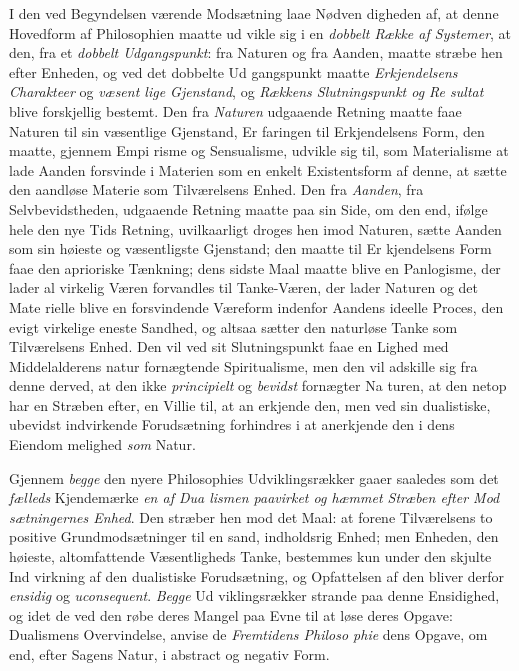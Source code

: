 I den ved Begyndelsen værende Modsætning laae Nødven\-%
digheden af, at denne Hovedform af Philosophien maatte ud\-%
vikle sig i en \emph{dobbelt Række af Systemer}, at den, fra et
\emph{dobbelt Udgangspunkt}: fra Naturen og fra Aanden,
maatte stræbe hen efter Enheden, og ved det dobbelte Ud\-%
gangspunkt maatte \emph{Erkjendelsens Charakteer} og \emph{væsent\-%
lige Gjenstand}, og \emph{Rækkens Slutningspunkt og Re\-%
sultat} blive forskjellig bestemt. Den fra \emph{Naturen} udgaaende
Retning maatte faae Naturen til sin væsentlige Gjenstand, Er\-%
faringen til Erkjendelsens Form, den maatte, gjennem Empi\-%
risme og Sensualisme, udvikle sig til, som Materialisme at lade
Aanden forsvinde i Materien som en enkelt Existentsform af
denne, at sætte den aandløse Materie som Tilværelsens Enhed.
Den fra \emph{Aanden}, fra Selvbevidstheden, udgaaende Retning
maatte paa sin Side, om den end, ifølge hele den nye Tids
Retning, uvilkaarligt droges hen imod Naturen, sætte Aanden
som sin høieste og væsentligste Gjenstand; den maatte til Er\-%
kjendelsens Form faae den aprioriske Tænkning; dens sidste
Maal maatte blive en Panlogisme, der lader al virkelig Væren
 forvandles til Tanke-Væren, der lader Naturen og det Mate\-%
rielle blive en forsvindende Væreform indenfor Aandens ideelle
Proces, den evigt virkelige eneste Sandhed, og altsaa sætter
den naturløse Tanke som Tilværelsens Enhed. Den vil ved
sit Slutningspunkt faae en Lighed med Middelalderens natur\-%
fornægtende Spiritualisme, men den vil adskille sig fra denne
derved, at den ikke \emph{principielt} og \emph{bevidst} fornægter Na\-%
turen, at den netop har en Stræben efter, en Villie til, at an\-%
erkjende den, men ved sin dualistiske, ubevidst indvirkende
Forudsætning forhindres i at anerkjende den i dens Eiendom\-%
melighed \emph{som} Natur.

Gjennem \emph{begge} den nyere Philosophies Udviklingsrækker
gaaer saaledes som det \emph{fælleds} Kjendemærke \emph{en af Dua\-%
lismen paavirket og hæmmet Stræben efter Mod\-%
sætningernes Enhed}. Den stræber hen mod det Maal: at
forene Tilværelsens to positive Grundmodsætninger til en sand,
indholdsrig Enhed; men Enheden, den høieste, altomfattende
Væsentligheds Tanke, bestemmes kun under den skjulte Ind\-%
virkning af den dualistiske Forudsætning, og Opfattelsen af
den bliver derfor \emph{ensidig} og \emph{uconsequent}. \emph{Begge} Ud\-%
viklingsrækker strande paa denne Ensidighed, og idet de ved
den røbe deres Mangel paa Evne til at løse deres Opgave:
Dualismens Overvindelse, anvise de \emph{Fremtidens Philoso\-%
phie} dens Opgave, om end, efter Sagens Natur, i abstract og
negativ Form.

